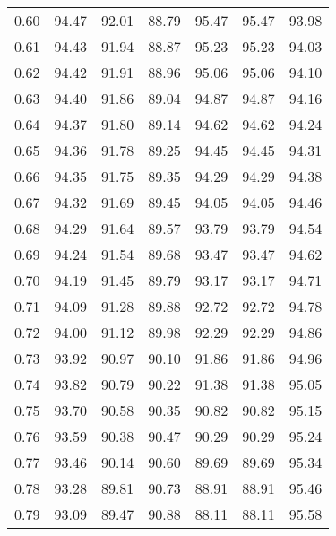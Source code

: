 \begin{tabular}{|c|c|c|c|c|c|c|}
      0.60 &     94.47 &     92.01 &      88.79 &   95.47 &      95.47 &         93.98 \\
      0.61 &     94.43 &     91.94 &      88.87 &   95.23 &      95.23 &         94.03 \\
      0.62 &     94.42 &     91.91 &      88.96 &   95.06 &      95.06 &         94.10 \\
      0.63 &     94.40 &     91.86 &      89.04 &   94.87 &      94.87 &         94.16 \\
      0.64 &     94.37 &     91.80 &      89.14 &   94.62 &      94.62 &         94.24 \\
      0.65 &     94.36 &     91.78 &      89.25 &   94.45 &      94.45 &         94.31 \\
      0.66 &     94.35 &     91.75 &      89.35 &   94.29 &      94.29 &         94.38 \\
      0.67 &     94.32 &     91.69 &      89.45 &   94.05 &      94.05 &         94.46 \\
      0.68 &     94.29 &     91.64 &      89.57 &   93.79 &      93.79 &         94.54 \\
      0.69 &     94.24 &     91.54 &      89.68 &   93.47 &      93.47 &         94.62 \\
      0.70 &     94.19 &     91.45 &      89.79 &   93.17 &      93.17 &         94.71 \\
      0.71 &     94.09 &     91.28 &      89.88 &   92.72 &      92.72 &         94.78 \\
      0.72 &     94.00 &     91.12 &      89.98 &   92.29 &      92.29 &         94.86 \\
      0.73 &     93.92 &     90.97 &      90.10 &   91.86 &      91.86 &         94.96 \\
      0.74 &     93.82 &     90.79 &      90.22 &   91.38 &      91.38 &         95.05 \\
      0.75 &     93.70 &     90.58 &      90.35 &   90.82 &      90.82 &         95.15 \\
      0.76 &     93.59 &     90.38 &      90.47 &   90.29 &      90.29 &         95.24 \\
      0.77 &     93.46 &     90.14 &      90.60 &   89.69 &      89.69 &         95.34 \\
      0.78 &     93.28 &     89.81 &      90.73 &   88.91 &      88.91 &         95.46 \\
      0.79 &     93.09 &     89.47 &      90.88 &   88.11 &      88.11 &         95.58 \\

\end{tabular}
